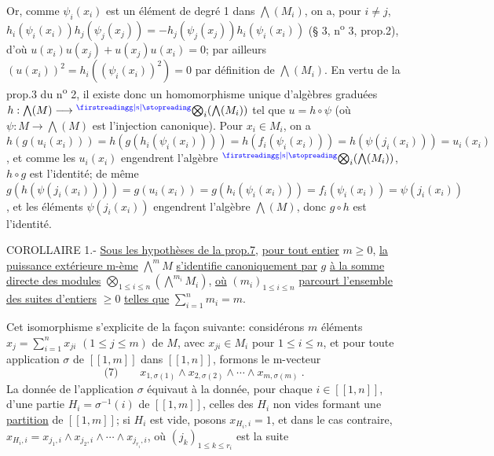 Or, comme $\psi_i(x_i)$ est un élément de degré 1 dans $\bigwedge(M_i)$, on a, pour $i\ne j$, $h_i(\psi_i(x_i))h_j(\psi_j(x_j))=-h_j(\psi_j(x_j))h_i(\psi_i(x_i))$ (§ 3, n\textsuperscript{o} 3, prop.2), d'où $u(x_i)u(x_j)+u(x_j)u(x_i)=0$; par ailleurs $(u(x_i))^2=h_i((\psi_i(x_i))^2)=0$ par définition de $\bigwedge(M_i)$. En vertu de la prop.3 du n\textsuperscript{o} 2, il existe donc un homomorphisme unique d'algèbres graduées $h:\bigwedge(M)\longrightarrow{}^{\unsure{\mathrm g|\mathrm s}}\!\bigotimes_i(\bigwedge(M_i))$ tel que $u=h\circ\psi$ (où $\psi:M\longrightarrow\bigwedge(M)$ est l'injection canonique). Pour $x_i\in M_i$, on a $h(g(u_i(x_i)))=h(g(h_i(\psi_i(x_i))))=h(f_i(\psi_i(x_i)))=h(\psi(j_i(x_i)))=u_i(x_i)$, et comme les $u_i(x_i)$ engendrent l'algèbre ${}^{\unsure{\mathrm g|\mathrm s}}\!\bigotimes_i(\bigwedge(M_i))$, $h\circ g$ est l'identité; de même $g(h(\psi(j_i(x_i))))=g(u_i(x_i))=g(h_i(\psi_i(x_i)))=f_i(\psi_i(x_i))=\psi(j_i(x_i))$, et les éléments $\psi(j_i(x_i))$ engendrent l'algèbre $\bigwedge(M)$, donc $g\circ h$ est l'identité.

COROLLAIRE 1.- \uline{Sous les hypothèses de la prop.7}, \uline{pour tout entier} $m\geq0$, \uline{la puissance extérieure m-ème} $\mathop{\bigwedge}\limits^m M$ \uline{s'identifie canoniquement par} $g$ \uline{à la somme directe des modules} $\bigotimes_{1\leq i\leq n}(\mathop{\bigwedge}\limits^{m_i}M_i)$, \uline{où} $(m_i)_{1\leq i\leq n}$ \uline{parcourt l'ensemble des suites d'entiers} $\geq0$ \uline{telles que} $\sum_{i=1}^n m_i=m$.

Cet isomorphisme s'explicite de la façon suivante: considérons $m$ éléments $x_j=\sum_{i=1}^n x_{ji}$ $(1\leq j\leq m)$ de $M$, avec $x_{ji}\in M_i$ pour $1\leq i\leq n$, et pour toute application $\sigma$ de $[\![1,m]\!]$ dans $[\![1,n]\!]$, formons le m-vecteur
\[
\text{(7)}\qquad x_{1,\sigma(1)}\wedge x_{2,\sigma(2)}\wedge\cdots\wedge x_{m,\sigma(m)}\ .
\]
La donnée de l'application $\sigma$ équivaut à la donnée, pour chaque $i\in[\![1,n]\!]$, d'une partie $H_i=\sigma^{-1}(i)$ de $[\![1,m]\!]$, celles des $H_i$ non vides formant une \uline{partition} de $[\![1,m]\!]$; si $H_i$ est vide, posons $x_{H_i,i}=1$, et dans le cas contraire, $x_{H_i,i}=x_{j_1,i}\wedge x_{j_2,i}\wedge\cdots\wedge x_{j_{r_i},i}$, où $(j_k)_{1\leq k\leq r_i}$ est la suite



